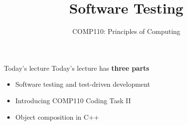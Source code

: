 \usepackage{../../beamerthemeFalmouthGamesAcademy}
\usepackage{multimedia}
\graphicspath{ {../../} }


\usepackage[normalem]{ulem}
\usepackage{wasysym}

\usepackage{pdfpages}


\title{Software Testing}   
\subtitle{COMP110: Principles of Computing}

\frame{\titlepage} 


\begin{frame}{Today's lecture}
    Today's lecture has \textbf{three parts}
    \begin{itemize}
        \item Software testing and test-driven development
        \item Introducing COMP110 Coding Task II
        \item Object composition in C++
    \end{itemize}
\end{frame}






%


